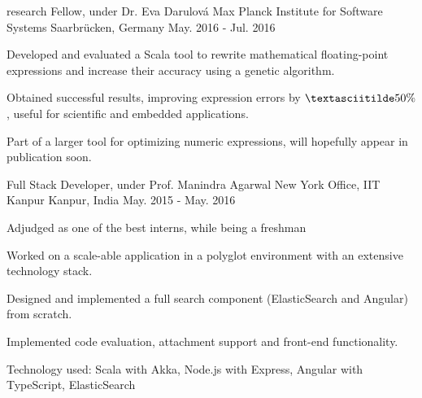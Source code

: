 


\begin{cventries}


  \cventry
  {research Fellow, under Dr. Eva Darulová} %
  {Max Planck Institute for Software Systems} %
  {Saarbrücken, Germany} %
  {May. 2016 - Jul. 2016} %
  {
    \begin{cvitems}
    \item {Developed and evaluated a Scala tool to rewrite
    mathematical floating-point expressions and increase their
    accuracy using a genetic algorithm.}
    \item {Obtained successful results, improving expression errors by
    $\textasciitilde50\%$, useful for scientific and embedded
    applications.}
    \item {Part of a larger tool for optimizing numeric expressions,
        will hopefully appear in publication soon.}
    \end{cvitems}
  }

  \cventry
  {Full Stack Developer, under Prof. Manindra Agarwal}
  {New York Office, IIT Kanpur}
  {Kanpur, India}
  {May. 2015 - May. 2016}
  {
    \begin{cvitems}
    \item Adjudged as one of the best interns, while being a freshman
    \item Worked on a scale-able application in a polyglot environment
      with an extensive technology stack.
    \item Designed and implemented a full search component
      (ElasticSearch and Angular) from scratch.
    \item Implemented code evaluation, attachment support and
      front-end functionality.
    \item Technology used: Scala with Akka, Node.js with Express,
      Angular with TypeScript, ElasticSearch
    \end{cvitems}
  }

\end{cventries}

